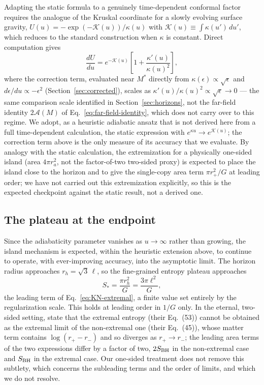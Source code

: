 \documentclass[11pt]{article}
\begin{document}
Adapting the static formula to a genuinely time-dependent conformal factor requires the analogue of the Kruskal coordinate for a slowly evolving surface gravity, $U(u)=-\exp(-\mathcal{K}(u))/\kappa(u)$ with $\mathcal{K}(u)\equiv\int\kappa(u')\,du'$, which reduces to the standard construction when $\kappa$ is constant. Direct computation gives
\begin{equation}
\frac{dU}{du}=e^{-\mathcal{K}(u)}\left[1+\frac{\kappa'(u)}{\kappa(u)^2}\right],
\end{equation}
where the correction term, evaluated near $M^*$ directly from $\kappa(\epsilon)\propto\sqrt\epsilon$ and $d\epsilon/du\propto-\epsilon^2$ (Section~\ref{sec:corrected}), scales as $\kappa'(u)/\kappa(u)^2\propto\sqrt\epsilon\to0$ — the same comparison scale identified in Section~\ref{sec:horizons}, not the far-field identity $2\mathcal{A}(M)$ of Eq.~\eqref{eq:far-field-identity}, which does not carry over to this regime. We adopt, as a heuristic adiabatic ansatz that is not derived here from a full time-dependent calculation, the static expression with $e^{\kappa u}\to e^{\mathcal{K}(u)}$; the correction term above is the only measure of its accuracy that we evaluate. By analogy with the static calculation, the extremization for a physically one-sided island (area $4\pi r_a^2$, not the factor-of-two two-sided proxy) is expected to place the island close to the horizon and to give the single-copy area term $\pi r_+^2/G$ at leading order; we have not carried out this extremization explicitly, so this is the expected checkpoint against the static result, not a derived one.

\subsection{The plateau at the endpoint}

Since the adiabaticity parameter vanishes as $u\to\infty$ rather than growing, the island mechanism is expected, within the heuristic extension above, to continue to operate, with ever-improving accuracy, into the asymptotic limit. The horizon radius approaches $r_h=\sqrt3\,\ell$, so the fine-grained entropy plateau approaches
\begin{equation}
S_*=\frac{\pi r_h^2}{G}=\frac{3\pi\ell^2}{G},
\end{equation}
the leading term of Eq.~\eqref{eq:KN-extremal}, a finite value set entirely by the regularization scale. This holds at leading order in $1/G$ only. In the eternal, two-sided setting, \citet{KimNam2021} state that the extremal entropy (their Eq.~(53)) cannot be obtained as the extremal limit of the non-extremal one (their Eq.~(45)), whose matter term contains $\log(r_+-r_-)$ and so diverges as $r_+\to r_-$; the leading area terms of the two expressions differ by a factor of two, $2S_{\rm BH}$ in the non-extremal case and $S_{\rm BH}$ in the extremal case. Our one-sided treatment does not remove this subtlety, which concerns the subleading terms and the order of limits, and which we do not resolve.
\end{document}
